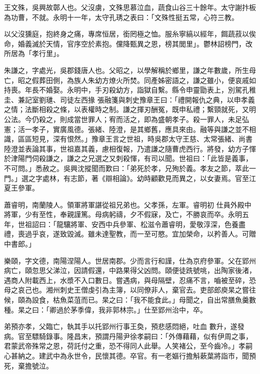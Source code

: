 \begin{pinyinscope}
 王文殊，吳興故鄣人也。父沒虜，文殊思慕泣血，蔬食山谷三十餘年。太守謝抃板為功曹，不就。永明十一年，太守孔琇之表曰：「文殊性挺五常，心符三教。



 以父沒獯庭，抱終身之痛，專席恒居，銜罔極之恤。服糸寧縞以經年，餌蔬菽以俟命，婚義滅於天情，官序空於素抱。儻降甄異之恩，榜其閭里」。鬱林詔榜門，改所居為「孝行里」。



 朱謙之，字處光，吳郡錢唐人也。父昭之，以學解稱於鄉里，謙之年數歲，所生母亡，昭之假葬田側，為族人朱幼方燎火所焚。同產姊密語之，謙之雖小，便哀戚如持喪。年長不婚娶。永明中，手刃殺幼方，詣獄自繫。縣令申靈勖表上，別駕孔稚圭、兼記室劉璡、司徒左西掾
 張融箋與刺史豫章王曰：「禮開報仇之典，以申孝義之情；法斷相殺之條，以表權時之制。謙之揮刃酬冤，既申私禮；繫頸就死，又明公法。今仍殺之，則成當世罪人；宥而活之，即為盛朝孝子。殺一罪人，未足弘憲；活一孝子，實廣風德。張緒、陸澄，是其鄉舊，應具來由。融等與謙之並不相識，區區短見，深有恨然。」豫章王言之世祖，時吳郡太守王慈、太常張緒、尚書陸澄並表論其事，世祖嘉其義，慮相復報，乃遣謙之隨曹虎西行。將發，幼方子惲於津陽門伺殺謙之，謙之之兄選之又刺殺惲，有司以聞。世祖曰：「此皆是義事，不可問。」悉赦之。吳興沈摐聞而歎曰：「弟死於孝，兄殉於義。孝友之節，萃此一門。」選之字處林，有志節，著《辯相論》。幼時顧歡見而異之，以女妻焉。官至江夏王參軍。



 蕭睿明，南蘭陵人。領軍將軍諶從祖兄弟也。父孝孫，左軍。睿明初
 仕員外殿中將軍，少有至性，奉親謹篤。母病躬禱，夕不假寐，及亡，不勝哀而卒。永明五年，世祖詔曰：「龍驤將軍、安西中兵參軍、松滋令蕭睿明，愛敬淳深，色養盡禮，喪過乎哀，遂致毀滅。雖未達聖教，而一至可愍。宜加榮命，以矜善人。可贈中書郎。」



 樂頤，字文德，南陽涅陽人。世居南郡。少而言行和謹，仕為京府參軍。父在郢州病亡，頤忽思父涕泣，因請假還，中路果得父凶問。頤便徒跣號咷，出陶家後渚，遇商人附載西上，水漿不入口數日。嘗遇病，與母隔壁，忍痛不言，嚙被至碎，恐母之哀己也。湘州刺史王僧虔引為主簿，以同僚非人，棄官去。吏部郎庾杲之嘗往候，頤為設食，枯魚菜菹而已。杲之曰：「我不能食此。」母聞之，自出常膳魚羹數種。杲之曰：「卿過於茅季偉，我非郭林宗。」仕至郢州治中，卒。



 弟預亦孝，父臨亡，執其手以托郢州行事王奐，預悲感悶絕，吐血
 數升，遂發病。官至驃騎錄事。隆昌末，預謂丹陽尹徐孝嗣曰：「外傳藉藉，似有伊周之事，君蒙武帝殊常之恩，荷託付之重，恐不得同人此舉。人笑褚公，至今齒冷。」孝嗣心甚納之。建武中為永世令，民懷其德。卒官。有一老嫗行擔斛蔌葉將詣市，聞預死，棄擔號泣。




\end{pinyinscope}

